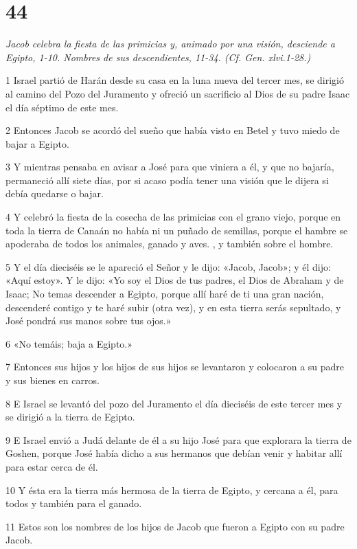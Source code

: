 \chapter{44}

\par \textit{Jacob celebra la fiesta de las primicias y, animado por una visión, desciende a Egipto, 1-10. Nombres de sus descendientes, 11-34. (Cf. Gen. xlvi.1-28.)}

\par 1 Israel partió de Harán desde su casa en la luna nueva del tercer mes, se dirigió al camino del Pozo del Juramento y ofreció un sacrificio al Dios de su padre Isaac el día séptimo de este mes.
\par 2 Entonces Jacob se acordó del sueño que había visto en Betel y tuvo miedo de bajar a Egipto.
\par 3 Y mientras pensaba en avisar a José para que viniera a él, y que no bajaría, permaneció allí siete días, por si acaso podía tener una visión que le dijera si debía quedarse o bajar.
\par 4 Y celebró la fiesta de la cosecha de las primicias con el grano viejo, porque en toda la tierra de Canaán no había ni un puñado de semillas, porque el hambre se apoderaba de todos los animales, ganado y aves. , y también sobre el hombre.
\par 5 Y el día dieciséis se le apareció el Señor y le dijo: «Jacob, Jacob»; y él dijo: «Aquí estoy». Y le dijo: «Yo soy el Dios de tus padres, el Dios de Abraham y de Isaac; No temas descender a Egipto, porque allí haré de ti una gran nación, descenderé contigo y te haré subir (otra vez), y en esta tierra serás sepultado, y José pondrá sus manos sobre tus ojos.»
\par 6 «No temáis; baja a Egipto.»
\par 7 Entonces sus hijos y los hijos de sus hijos se levantaron y colocaron a su padre y sus bienes en carros.
\par 8 E Israel se levantó del pozo del Juramento el día dieciséis de este tercer mes y se dirigió a la tierra de Egipto.
\par 9 E Israel envió a Judá delante de él a su hijo José para que explorara la tierra de Goshen, porque José había dicho a sus hermanos que debían venir y habitar allí para estar cerca de él.
\par 10 Y ésta era la tierra más hermosa de la tierra de Egipto, y cercana a él, para todos y también para el ganado.
\par 11 Estos son los nombres de los hijos de Jacob que fueron a Egipto con su padre Jacob.
